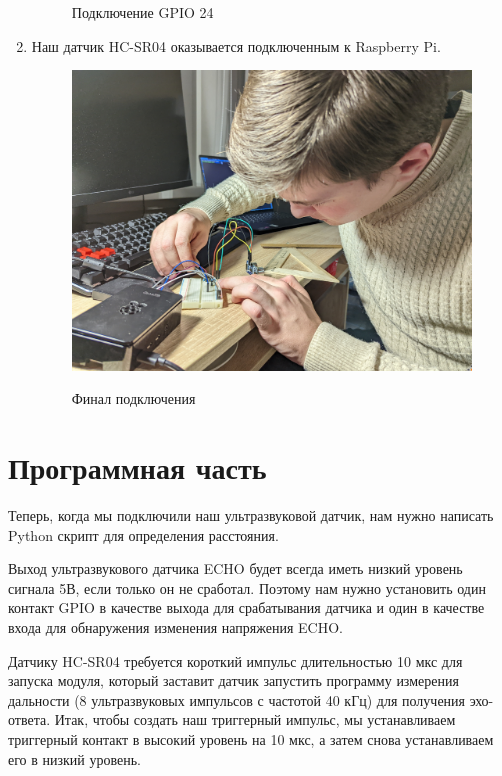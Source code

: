 \documentclass[a4paper, 14pt]{article}
\begin{document}
\begin{enumerate}
\begin{figure}[H]
		      \caption{Подключение GPIO 24}
	      \end{figure}
	\item Наш датчик HC-SR04 оказывается подключенным к Raspberry Pi.
	      \begin{figure}[H]
		      \centering
		      \includegraphics[width=14cm]{screenshots/11.png}\\
		      \caption{Финал подключения}
	      \end{figure}
\end{enumerate}

\newpage
\section{Программная часть}

Теперь, когда мы подключили наш ультразвуковой датчик, нам нужно написать Python скрипт для определения расстояния.

Выход ультразвукового датчика ECHO будет всегда иметь низкий уровень сигнала 5В, если только он не сработал. Поэтому нам нужно установить один контакт GPIO в качестве выхода для срабатывания датчика и один в качестве входа для обнаружения изменения напряжения ECHO.

Датчику HC-SR04 требуется короткий импульс длительностью 10 мкс для запуска модуля, который заставит датчик запустить программу измерения дальности (8 ультразвуковых импульсов с частотой 40 кГц) для получения эхо-ответа. Итак, чтобы создать наш триггерный импульс, мы устанавливаем триггерный контакт в высокий уровень на 10 мкс, а затем снова устанавливаем его в низкий уровень.
\end{document}

